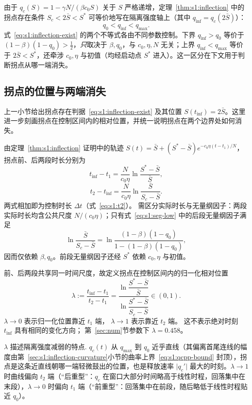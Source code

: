 \documentclass[lang=cn,a4paper,newtx]{elegantpaper}
\numberwithin{equation}{section}
\theoremstyle{plain}
\newcommand{\qinf}{q_{\mathrm{inf}}}
\begin{document}
由于 $q_c(S)=1-\gamma N/(\beta c_0 S)$ 关于 $S$ 严格递增，定理~\ref{thm:s1:inflection} 中的拐点存在条件 $S_c<2\bar S<S^*$ 可等价地写在隔离强度轴上（其中 $\qinf=q_c(2\bar S)$）：
\begin{equation}
q_0<\qinf<q_{\max}.
\label{eq:s1:inflection-exist}
\end{equation}
式~\eqref{eq:s1:inflection-exist} 的两个不等式各由不同参数控制。下界 $\qinf>q_0$ 等价于 $(1-\beta)(1-q_0)>\tfrac12$，\emph{只}取决于 $\beta,q_0$，与 $c_0,\eta,N$ 无关；上界 $\qinf<q_{\max}$ 等价于 $2\bar S<S^*$，还牵涉 $c_0,\eta$ 与初值（均经启动点 $S^*$ 进入）。这一区分在下文用于判断拐点从哪一端消失。


\subsection{拐点的位置与两端消失}
\label{sec:s1:inflection-position}
上一小节给出拐点存在判据~\eqref{eq:s1:inflection-exist} 及其位置 $S(t_{\mathrm{inf}})=2\bar S$。这里进一步刻画拐点在控制区间内的相对位置，并统一说明拐点在两个边界处如何消失。

由定理~\ref{thm:s1:inflection} 证明中的轨迹
$S(t)=\bar S+(S^*-\bar S)e^{-c_0\eta(t-t_1)/N}$，
拐点前、后两段时长分别为
\begin{equation}
t_{\mathrm{inf}}-t_1
=
\frac{N}{c_0\eta}
\ln\frac{S^*-\bar S}{\bar S},
\label{eq:s1:seg-high}
\end{equation}
\begin{equation}
t_2-t_{\mathrm{inf}}
=
\frac{N}{c_0\eta}
\ln\frac{\bar S}{S_c-\bar S}.
\label{eq:s1:seg-low}
\end{equation}
两式相加即为控制时长 $\Delta t$（式~\eqref{eq:s1:t2}）。
需区分实际时长与无量纲因子：两段实际时长均含公共尺度
$N/(c_0\eta)$；只有式~\eqref{eq:s1:seg-low} 中的后段无量纲因子满足
\[
\ln\frac{\bar S}{S_c-\bar S}
=
\ln
\frac{(1-\beta)(1-q_0)}
{1-(1-\beta)(1-q_0)},
\]
因而仅依赖 $\beta,q_0$。前段无量纲因子还经 $S^*$ 依赖
$c_0,\eta$ 与初值。

前、后两段共享同一时间尺度，故定义拐点在控制区间内的归一化相对位置
\begin{equation}
\lambda
:=
\frac{t_{\mathrm{inf}}-t_1}{t_2-t_1}
=
\frac{
\ln\dfrac{S^*-\bar S}{\bar S}
}{
\ln\dfrac{S^*-\bar S}{S_c-\bar S}
}
\in(0,1).
\label{eq:s1:lambda}
\end{equation}
$\lambda\to0$ 表示归一化位置靠近 $t_1$ 端，
$\lambda\to1$ 表示靠近 $t_2$ 端。
这不表示绝对时刻 $t_{\mathrm{inf}}$ 具有相同的变化方向；
第~\ref{sec:num}节参数下 $\lambda=0.458$。

$\lambda$ 描述隔离强度减弱的特点. $q_c(t)$ 从 $q_{\max}$ 到 $q_0$ 近乎直线（其偏离首尾连线的幅度由第~\ref{sec:s1:inflection-curvature}小节的曲率上界~\eqref{eq:s1:qcpp-bound} 封顶），拐点是这条近直线朝哪一端轻微鼓出的位置，也是释放速率 $\lvert q_c'\rvert$ 最大的时刻。$\lambda\to1$ 时曲线偏向 $t_2$ 端（``后重型''：$q_c$ 在窗口大部分时间略高于线性时程，回落集中在末段），$\lambda\to0$ 时偏向 $t_1$ 端（``前重型''：回落集中在前段，随后略低于线性时程贴近 $q_0$）。
\end{document}
